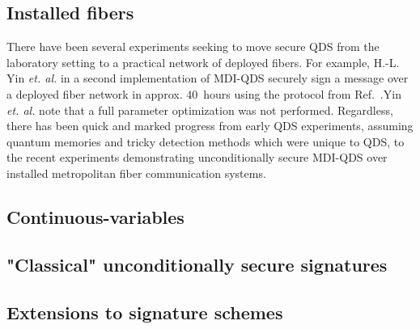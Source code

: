 \subsection*{Installed fibers}
There have been several experiments seeking to move secure QDS from the laboratory setting to a practical network of deployed fibers. For example, H.-L. Yin \emph{et. al.} in a second implementation of MDI-QDS \cite{Yin2017} securely sign a message over a deployed fiber network in approx. $40$~hours using the protocol from Ref.~\cite{Puthoor2016}.Yin \emph{et. al.} note that a full parameter optimization was not performed. Regardless, there has been quick and marked progress from early QDS experiments, assuming quantum memories and tricky detection methods which were unique to QDS, to the recent experiments demonstrating unconditionally secure MDI-QDS over installed metropolitan fiber communication systems.










\subsection*{Continuous-variables}



\subsection{"Classical" unconditionally secure signatures}

\subsection{Extensions to signature schemes}